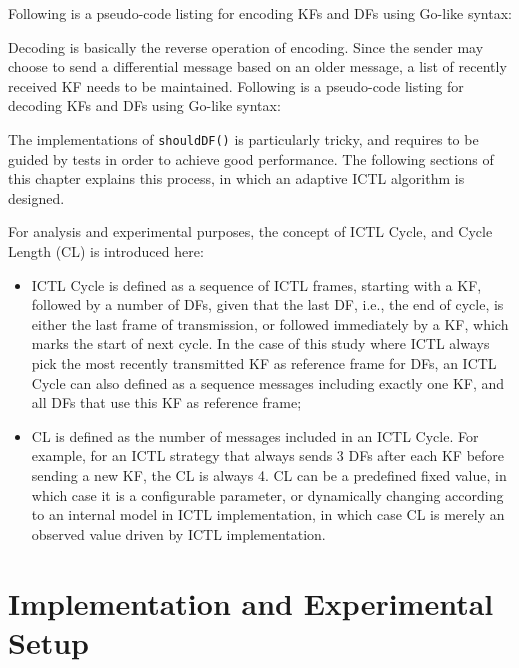 \documentclass[12pt]{report}
\begin{document}
Following is a pseudo-code listing for encoding KFs and DFs using Go-like syntax:

\begin{singlespace}
  
\end{singlespace}

Decoding is basically the reverse operation of encoding. Since the sender may choose to send a differential message based on an older message, a list of recently received KF needs to be maintained. Following is a pseudo-code listing for decoding KFs and DFs using Go-like syntax:

\begin{singlespace}
  
\end{singlespace}

The implementations of \texttt{shouldDF()} is particularly tricky, and requires to be guided by tests in order to achieve good performance. The following sections of this chapter explains this process, in which an adaptive ICTL algorithm is designed.

For analysis and experimental purposes, the concept of ICTL Cycle, and Cycle Length (CL) is introduced here:
\begin{itemize}
  \item ICTL Cycle is defined as a sequence of ICTL frames, starting with a KF, followed by a number of DFs, given that the last DF, i.e., the end of cycle, is either the last frame of transmission, or followed immediately by a KF, which marks the start of next cycle. In the case of this study where ICTL always pick the most recently transmitted KF as reference frame for DFs, an ICTL Cycle can also defined as a sequence messages including exactly one KF, and all DFs that use this KF as reference frame;
  \item CL is defined as the number of messages included in an ICTL Cycle. For example, for an ICTL strategy that always sends 3 DFs after each KF before sending a new KF, the CL is always 4. CL can be a predefined fixed value, in which case it is a configurable parameter, or dynamically changing according to an internal model in ICTL implementation, in which case CL is merely an observed value driven by ICTL implementation.
\end{itemize}

\section{Implementation and Experimental Setup}
\end{document}
